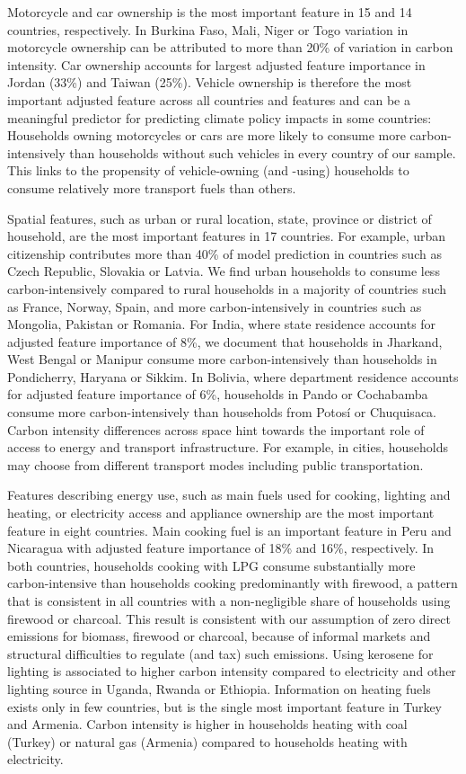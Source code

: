 \documentclass[12pt, a4paper]{article}
\begin{document}
Motorcycle and car ownership is the most important feature in 15 and 14 countries, respectively. In Burkina Faso, Mali, Niger or Togo variation in motorcycle ownership can be attributed to more than 20\% of variation in carbon intensity. Car ownership accounts for largest adjusted feature importance in Jordan (33\%) and Taiwan (25\%). Vehicle ownership is therefore the most important adjusted feature across all countries and features and can be a meaningful predictor for predicting climate policy impacts in some countries: Households owning motorcycles or cars are more likely to consume more carbon-intensively than households without such vehicles in every country of our sample. This links to the propensity of vehicle-owning (and -using) households to consume relatively more transport fuels than others.

Spatial features, such as urban or rural location, state, province or district of household, are the most important features in 17 countries. For example, urban citizenship contributes more than 40\% of model prediction in countries such as Czech Republic, Slovakia or Latvia. We find urban households to consume less carbon-intensively compared to rural households in a majority of countries such as France, Norway, Spain, and more carbon-intensively in countries such as Mongolia, Pakistan or Romania. For India, where state residence accounts for adjusted feature importance of 8\%, we document that households in Jharkand, West Bengal or Manipur consume more carbon-intensively than households in Pondicherry, Haryana or Sikkim. In Bolivia, where department residence accounts for adjusted feature importance of 6\%, households in Pando or Cochabamba consume more carbon-intensively than households from Potosí or Chuquisaca. Carbon intensity differences across space hint towards the important role of access to energy and transport infrastructure. For example, in cities, households may choose from different transport modes including public transportation. 

Features describing energy use, such as main fuels used for cooking, lighting and heating, or electricity access and appliance ownership are the most important feature in eight countries. Main cooking fuel is an important feature in Peru and Nicaragua with adjusted feature importance of 18\% and 16\%, respectively. In both countries, households cooking with LPG consume substantially more carbon-intensive than households cooking predominantly with firewood, a pattern that is consistent in all countries with a non-negligible share of households using firewood or charcoal. This result is consistent with our assumption of zero direct emissions for biomass, firewood or charcoal, because of informal markets and structural difficulties to regulate (and tax) such emissions. Using kerosene for lighting is associated to higher carbon intensity compared to electricity and other lighting source in Uganda, Rwanda or Ethiopia. Information on heating fuels exists only in few countries, but is the single most important feature in Turkey and Armenia. Carbon intensity is higher in households heating with coal (Turkey) or natural gas (Armenia) compared to households heating with electricity.
\end{document}

